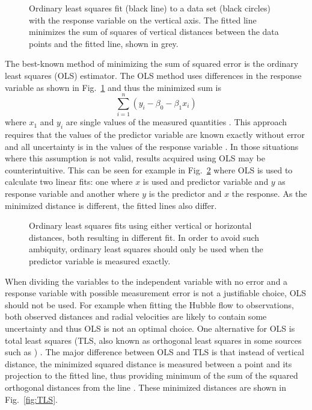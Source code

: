 \documentclass[english, oneside]{HYgradu}
\begin{document}
\begin{figure}
    \centering
    
    \caption{Ordinary least squares fit (black line) to a data set (black circles) with the response variable on the vertical axis. The fitted line minimizes the sum of squares of vertical distances between the data points and the fitted line, shown in grey.}\label{fig:OLS}
\end{figure}

The best-known method of minimizing the sum of squared error is the ordinary least squares (OLS) estimator. The OLS method uses differences in the response variable as shown in Fig.\ \ref{fig:OLS} and thus the minimized sum is
\begin{equation}
	\sum_{i=1}^n (y_i - \beta_0 - \beta_1 x_i)
\end{equation}
where $x_1$ and $y_i$ are single values of the measured quantities \citep{feigelson2012modern}. This approach requires that the values of the predictor variable are known exactly without error and all uncertainty is in the values of the response variable \citep{feigelson2012modern}. In those situations where this assumption is not valid, results acquired using OLS may be counterintuitive. This can be seen for example in Fig.\ \ref{fig:OLSproblem} where OLS is used to calculate two linear fits: one where $x$ is used and predictor variable and $y$ as response variable and another where $y$ is the predictor and $x$ the response. As the minimized distance is different, the fitted lines also differ.

\begin{figure}
    \centering
    
    \caption{Ordinary least squares fits using either vertical or horizontal distances, both resulting in different fit. In order to avoid such ambiquity, ordinary least squares should only be used when the predictor variable is measured exactly.}\label{fig:OLSproblem}
\end{figure}

When dividing the variables to the independent variable with no error and a response variable with possible measurement error is not a justifiable choice, OLS should not be used. For example when fitting the Hubble flow to observations, both observed distances and radial velocities are likely to contain some uncertainty and thus OLS is not an optimal choice. One alternative for OLS is total least squares (TLS, also known as orthogonal least squares in some sources such as \citet{feigelson2012modern}) \citep{markovsky2007overview}.  The major difference between OLS and TLS is that instead of vertical distance, the minimized squared distance is measured between a point and its projection to the fitted line, thus providing minimum of the sum of the squared orthogonal distances from the line \citep{feigelson2012modern}. These minimized distances are shown in Fig.\ \ref{fig:TLS}.
\end{document}
